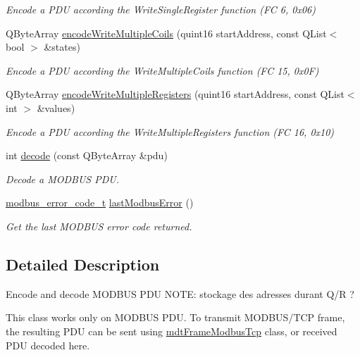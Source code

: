 \begin{DoxyCompactItemize}
\begin{DoxyCompactList}\small\item\em Encode a PDU according the WriteSingleRegister function (FC 6, 0x06) \end{DoxyCompactList}\item 
QByteArray \hyperlink{classmdt_frame_codec_modbus_a12013e4433f96b2658b464698135e9fa}{encodeWriteMultipleCoils} (quint16 startAddress, const QList$<$ bool $>$ \&states)
\begin{DoxyCompactList}\small\item\em Encode a PDU according the WriteMultipleCoils function (FC 15, 0x0F) \end{DoxyCompactList}\item 
QByteArray \hyperlink{classmdt_frame_codec_modbus_a04092bf1d376c4c630b2311cbc5dd126}{encodeWriteMultipleRegisters} (quint16 startAddress, const QList$<$ int $>$ \&values)
\begin{DoxyCompactList}\small\item\em Encode a PDU according the WriteMultipleRegisters function (FC 16, 0x10) \end{DoxyCompactList}\item 
int \hyperlink{classmdt_frame_codec_modbus_a426f465363a49d70890a462b40677787}{decode} (const QByteArray \&pdu)
\begin{DoxyCompactList}\small\item\em Decode a MODBUS PDU. \end{DoxyCompactList}\item 
\hyperlink{classmdt_frame_codec_modbus_a31d8291be7f8636d5d295ce3066d7ac7}{modbus\_\-error\_\-code\_\-t} \hyperlink{classmdt_frame_codec_modbus_a21f3102e12f1a1d9c4145c1ce1f8e6b6}{lastModbusError} ()
\begin{DoxyCompactList}\small\item\em Get the last MODBUS error code returned. \end{DoxyCompactList}\end{DoxyCompactItemize}


\subsection{Detailed Description}
Encode and decode MODBUS PDU NOTE: stockage des adresses durant Q/R ? 

This class works only on MODBUS PDU. To transmit MODBUS/TCP frame, the resulting PDU can be sent using \hyperlink{classmdt_frame_modbus_tcp}{mdtFrameModbusTcp} class, or received PDU decoded here.

